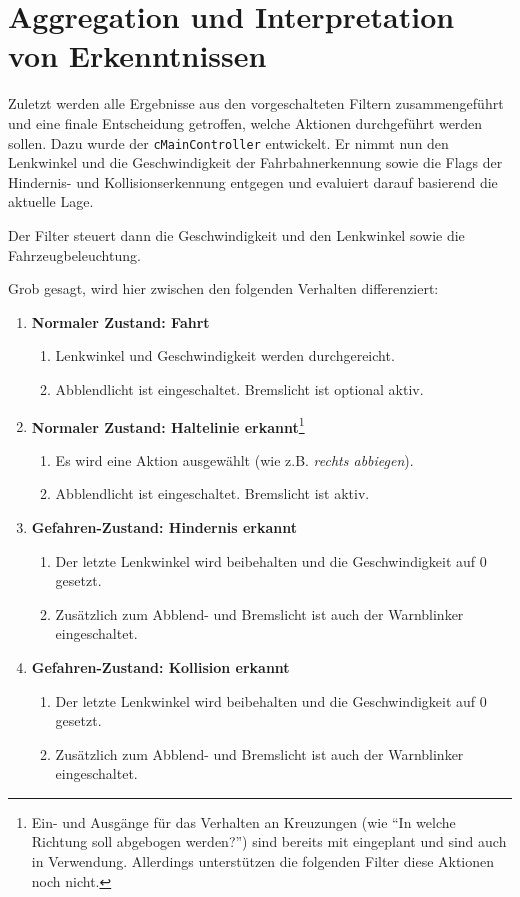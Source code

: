 \documentclass[a4paper,12pt]{report}
\begin{document}
\chapter{Aggregation und Interpretation von Erkenntnissen}

	Zuletzt werden alle Ergebnisse aus den vorgeschalteten Filtern zusammengeführt und eine finale Entscheidung getroffen, welche Aktionen durchgeführt werden sollen.
	Dazu wurde der \texttt{cMainController} entwickelt. Er nimmt nun den Lenkwinkel und die Geschwindigkeit der Fahrbahnerkennung sowie die Flags der Hindernis- und Kollisionserkennung entgegen und evaluiert darauf basierend die aktuelle Lage.

	Der Filter steuert dann die Geschwindigkeit und den Lenkwinkel sowie die Fahrzeugbeleuchtung.

	Grob gesagt, wird hier zwischen den folgenden Verhalten differenziert:

	\begin{enumerate}
		\item{\textbf{Normaler Zustand: Fahrt}
			\begin{enumerate}
				\item Lenkwinkel und Geschwindigkeit werden durchgereicht.
				\item Abblendlicht ist eingeschaltet. Bremslicht ist optional aktiv.
			\end{enumerate}
		}
		\item{\textbf{Normaler Zustand: Haltelinie erkannt}\footnote{Ein- und Ausgänge für das Verhalten an Kreuzungen (wie ``In welche Richtung soll abgebogen werden?'') sind bereits mit eingeplant und sind auch in Verwendung. Allerdings unterstützen die folgenden Filter diese Aktionen noch nicht.}
			\begin{enumerate}
				\item Es wird eine Aktion ausgewählt (wie z.B. \emph{rechts abbiegen}).
				\item Abblendlicht ist eingeschaltet. Bremslicht ist aktiv.
			\end{enumerate}
		}
		\item{\textbf{Gefahren-Zustand: Hindernis erkannt}
			\begin{enumerate}
				\item Der letzte Lenkwinkel wird beibehalten und die Geschwindigkeit auf $0$ gesetzt.
				\item Zusätzlich zum Abblend- und Bremslicht ist auch der Warnblinker eingeschaltet.
			\end{enumerate}
		}
		\item{\textbf{Gefahren-Zustand: Kollision erkannt}
			\begin{enumerate}
				\item Der letzte Lenkwinkel wird beibehalten und die Geschwindigkeit auf $0$ gesetzt.
				\item Zusätzlich zum Abblend- und Bremslicht ist auch der Warnblinker eingeschaltet.
			\end{enumerate}
		}
	\end{enumerate}
\end{document}
